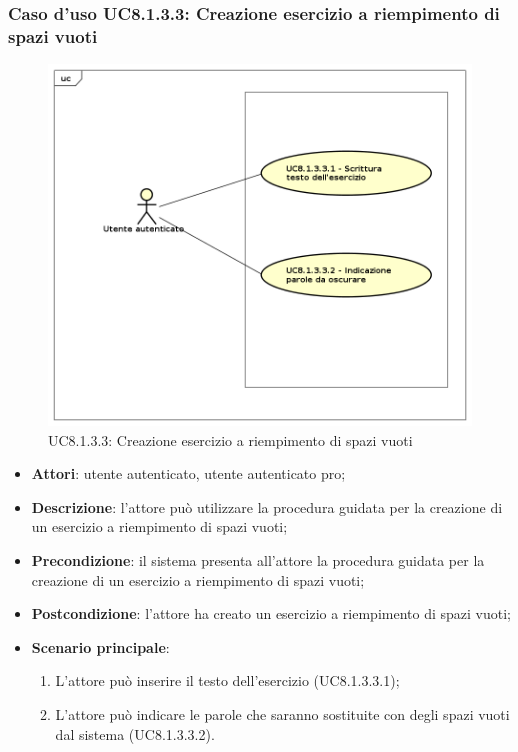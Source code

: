\subsubsection{Caso d'uso UC8.1.3.3: Creazione esercizio a riempimento di spazi vuoti}
	\label{UC8.1.3.3}
	\begin{figure}[h]
		\centering
			\includegraphics[scale=0.45,keepaspectratio]{UML/UC8_1_3_3.png}
		\caption{UC8.1.3.3: Creazione esercizio a riempimento di spazi vuoti}
	\end{figure}
	\FloatBarrier
	\begin{itemize}
		\item
			\textbf{Attori}: utente autenticato, utente autenticato pro;
		\item		
			\textbf{Descrizione}: l'attore può utilizzare la procedura guidata per la creazione di un esercizio a riempimento di spazi vuoti;
		\item
			\textbf{Precondizione}: il sistema presenta all'attore la procedura guidata per la creazione di un esercizio a riempimento di spazi vuoti;
		\item
			\textbf{Postcondizione}: l'attore ha creato un esercizio a riempimento di spazi vuoti;
		\item
			\textbf{Scenario principale}:
	       		\begin{enumerate}
	       			\item
	       			L'attore può inserire il testo dell'esercizio (UC8.1.3.3.1);
	       			\item
	       			L'attore può indicare le parole che saranno sostituite con degli spazi vuoti dal sistema (UC8.1.3.3.2).
	 			\end{enumerate}
	\end{itemize}
	
